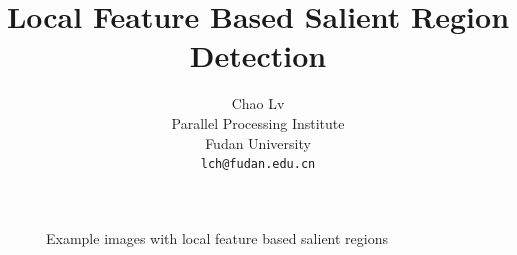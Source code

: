 \documentclass[10pt,twocolumn,letterpaper]{article}
\begin{document}
\title{Local Feature Based Salient Region Detection}

\author{
	\alignauthor
	Chao Lv\\
    Parallel Processing Institute\\
    Fudan University\\
    {\tt\small lch@fudan.edu.cn}
}

\maketitle


\begin{figure}[!t]
	\centering
	\hfil
	\caption{Example images with local feature based salient regions}
	\label{fig:observations}
\end{figure}















{\small


}
\end{document}
